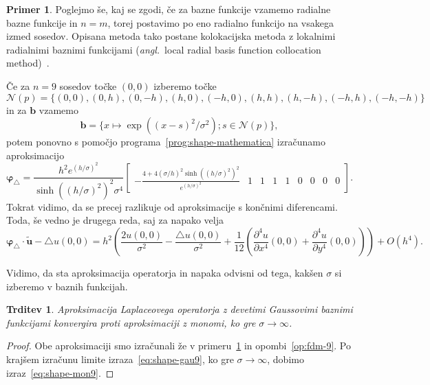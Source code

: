\documentclass[12pt,a4paper,twoside]{article}
\theoremstyle{definition} %
\newtheorem{primer}[definicija]{Primer}
\theoremstyle{plain} %
\newtheorem{trditev}[definicija]{Trditev}
\numberwithin{equation}{section}
\newcommand{\Nc}{\mathcal{N}}
\newcommand{\lap}{\triangle}
\renewcommand{\b}{\boldsymbol}
\renewcommand{\phi}{\varphi}
\newcommand{\dpar}[2]{\ensuremath{\frac{\partial #1}{\partial #2}}}
\newcommand{\ang}[1]{(\hspace{-1.5px}\textit{angl.}\ #1)}
\begin{document}
\begin{primer}
\label{prim:rbf}
Poglejmo še, kaj se zgodi, če za bazne funkcije vzamemo radialne bazne funkcije in $n = m$, torej
postavimo po eno radialno funkcijo na vsakega izmed sosedov. Opisana metoda tako postane
kolokacijska metoda z lokalnimi radialnimi baznimi funkcijami \ang{local radial basis function
collocation method}~\cite{kosec2011h}.

Če za $n = 9$ sosedov točke $(0, 0)$ izberemo točke
\small
\begin{equation}
  \Nc(p) = \{  (0, 0), (0, h), (0, -h), (h, 0), (-h, 0), (h, h), (h, -h), (-h, h), (-h, -h)\}
\end{equation}
\normalsize
in za $\b b$ vzamemo
\begin{equation}
  \b b = \{ x\mapsto \exp((x-s)^2/\sigma^2); s \in \Nc(p)\},
\end{equation}
potem ponovno s pomočjo programa~\ref{prog:shape-mathematica} izračunamo aproksimacijo
\begin{equation}
  \b\phi_\lap =\textstyle \frac{h^2 e^{(h/\sigma)^2}}{\sinh((h/\sigma)^2)^2 \sigma^4}
\begin{bmatrix}
  -\frac{4 + 4(\sigma/h)^2  \sinh((h/\sigma)^2)^2 }{e^{(h/\sigma)^2}} & 1 & 1 & 1 & 1 & 0 & 0 & 0 & 0
 \end{bmatrix}.
  \label{eq:shape-gau9}
\end{equation}
Tokrat vidimo, da se precej razlikuje od aproksimacije s končnimi diferencami.
Toda, še vedno je drugega reda, saj za napako velja
\begin{equation}
  \b \phi_\lap\!\cdot \b{\tilde{u}} - \lap u(0, 0) = \textstyle
  h^2\left(\frac{2u(0, 0)}{\sigma^2} - \frac{\lap u(0, 0)}{\sigma^2} +
  \frac{1}{12}\left( \dpar{^4u}{x^4}(0, 0) + \dpar{^4u}{y^4}(0, 0) \right)\right)
  + O(h^4).
\end{equation}
\end{primer}

Vidimo, da sta aproksimacija operatorja in napaka odvisni od tega, kakšen
$\sigma$ si izberemo v baznih funkcijah.
\begin{trditev}
  \label{trd:rbf-konv-k-mon}
  Aproksimacija Laplaceovega operatorja z devetimi Gaussovimi baznimi funkcijami
  konvergira proti aproksimaciji z monomi, ko gre $\sigma \to \infty$.
\end{trditev}
\begin{proof}
  Obe aproksimaciji smo izračunali že v primeru~\ref{prim:rbf} in
  opombi~\ref{op:fdm-9}. Po krajšem izračunu limite izraza~\eqref{eq:shape-gau9},
  ko gre $\sigma \to \infty$, dobimo izraz~\eqref{eq:shape-mon9}.
\end{proof}
\end{document}
